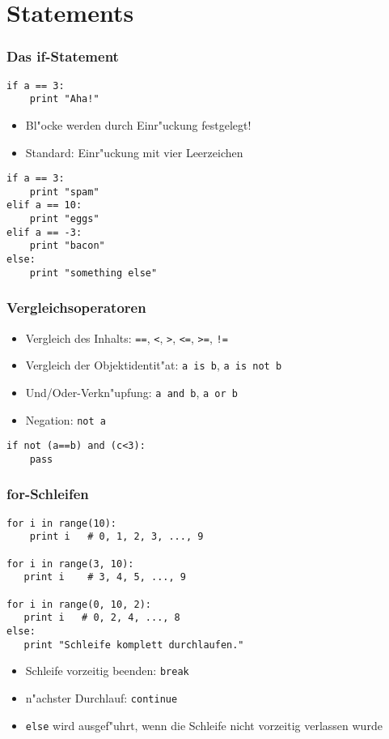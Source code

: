 \section{Statements}

\begin{frame}[fragile]
\frametitle{Das if-Statement}
\begin{lstlisting}[style=Python]
if a == 3:
    print "Aha!"
\end{lstlisting}
\begin{itemize}
\item Bl"ocke werden durch Einr"uckung festgelegt!
\item Standard: Einr"uckung mit vier Leerzeichen
\end{itemize}
\begin{lstlisting}
if a == 3:
    print "spam"
elif a == 10:
    print "eggs"
elif a == -3:
    print "bacon"
else:
    print "something else"
\end{lstlisting}
\end{frame}

\begin{frame}[fragile]
\frametitle{Vergleichsoperatoren}
\begin{itemize}
\item Vergleich des Inhalts: \texttt{==}, \texttt{<}, \texttt{>}, \texttt{<=}, \texttt{>=}, \texttt{!=}
\item Vergleich der Objektidentit"at: \lstinline{a is b}, \lstinline{a is not b}\item Und/Oder-Verkn"upfung: \lstinline{a and b}, \lstinline{a or b}
\item Negation: \lstinline{not a}
\end{itemize}
\begin{lstlisting}
if not (a==b) and (c<3):
    pass
\end{lstlisting}
\end{frame}

\begin{frame}[fragile]
\frametitle{for-Schleifen}
\begin{lstlisting}[style=Python]
for i in range(10):
    print i   # 0, 1, 2, 3, ..., 9

for i in range(3, 10):
   print i    # 3, 4, 5, ..., 9

for i in range(0, 10, 2):
   print i   # 0, 2, 4, ..., 8
else:
   print "Schleife komplett durchlaufen."
\end{lstlisting}
\begin{itemize}
\item Schleife vorzeitig beenden: \texttt{break}
\item n"achster Durchlauf: \texttt{continue}
\item \texttt{else} wird ausgef"uhrt, wenn die Schleife nicht vorzeitig verlassen wurde
\end{itemize}
\end{frame}

